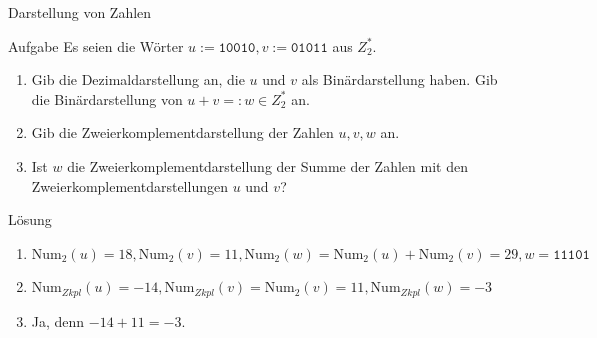 \begin{frame}{Darstellung von Zahlen}
    \begin{exampleblock}{Aufgabe}
    	Es seien die Wörter $u := \texttt{10010}, v := \texttt{01011}$ aus $Z_2^*$.
    	\begin{enumerate}
     		\item Gib die Dezimaldarstellung an, die $u$ und $v$ als Binärdarstellung haben. Gib die Binärdarstellung von $u+v=:w \in Z_2^*$ an.
    		\item Gib die Zweierkomplementdarstellung der Zahlen $u, v, w$ an.
    		\item Ist $w$ die Zweierkomplementdarstellung der Summe der Zahlen mit den Zweierkomplementdarstellungen $u$ und $v$?
  		\end{enumerate}
    \end{exampleblock}
    \pause
    \begin{block}{Lösung}
    	\begin{enumerate}
     		\item $\text{Num}_2(u)=18, \text{Num}_2(v)=11, \text{Num}_2(w) = \text{Num}_2(u)+\text{Num}_2(v)=29, w=\texttt{11101}$
    		\pause \item $\text{Num}_{Zkpl}(u)=-14, \text{Num}_{Zkpl}(v)=\text{Num}_2(v)=11, \text{Num}_{Zkpl}(w)=-3$
    		\pause \item Ja, denn $-14+11=-3$.
  		\end{enumerate}
    \end{block}
\end{frame}




